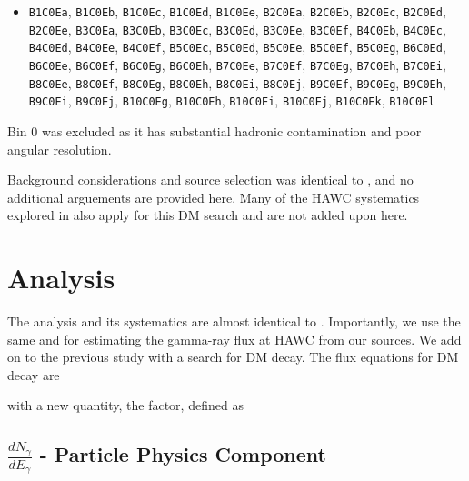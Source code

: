 \begin{itemize}
    \item[] \texttt{B1C0Ea}, \texttt{B1C0Eb}, \texttt{B1C0Ec}, \texttt{B1C0Ed}, \texttt{B1C0Ee}, \texttt{B2C0Ea}, \texttt{B2C0Eb}, \texttt{B2C0Ec}, \texttt{B2C0Ed}, \texttt{B2C0Ee}, \texttt{B3C0Ea}, \texttt{B3C0Eb}, \texttt{B3C0Ec}, \texttt{B3C0Ed}, \texttt{B3C0Ee}, \texttt{B3C0Ef}, \texttt{B4C0Eb}, \texttt{B4C0Ec}, \texttt{B4C0Ed}, \texttt{B4C0Ee}, \texttt{B4C0Ef}, \texttt{B5C0Ec}, \texttt{B5C0Ed}, \texttt{B5C0Ee}, \texttt{B5C0Ef}, \texttt{B5C0Eg}, \texttt{B6C0Ed}, \texttt{B6C0Ee}, \texttt{B6C0Ef}, \texttt{B6C0Eg}, \texttt{B6C0Eh}, \texttt{B7C0Ee}, \texttt{B7C0Ef}, \texttt{B7C0Eg}, \texttt{B7C0Eh}, \texttt{B7C0Ei}, \texttt{B8C0Ee}, \texttt{B8C0Ef}, \texttt{B8C0Eg}, \texttt{B8C0Eh}, \texttt{B8C0Ei}, \texttt{B8C0Ej}, \texttt{B9C0Ef}, \texttt{B9C0Eg}, \texttt{B9C0Eh}, \texttt{B9C0Ei}, \texttt{B9C0Ej}, \texttt{B10C0Eg}, \texttt{B10C0Eh}, \texttt{B10C0Ei}, \texttt{B10C0Ej}, \texttt{B10C0Ek}, \texttt{B10C0El}
\end{itemize}
Bin 0 was excluded as it has substantial hadronic contamination and poor angular resolution.

Background considerations and source selection was identical to , and no additional arguements are provided here.
Many of the HAWC systematics explored in  also apply for this DM search and are not added upon here.

\section{Analysis}\label{sec:mtd_analysis}

The analysis and its systematics are almost identical to .
Importantly, we use the same  and  for estimating the gamma-ray flux at HAWC from our sources.
We add on to the previous study with a search for DM decay.
The flux equations for DM decay are
\iddmdecay[\gamma]

with a new quantity, the \D factor, defined as
\dfactor

\subsection{$\frac{dN_\gamma}{dE_\gamma}$ - Particle Physics Component}\label{sec:mtd_particlephysics}

